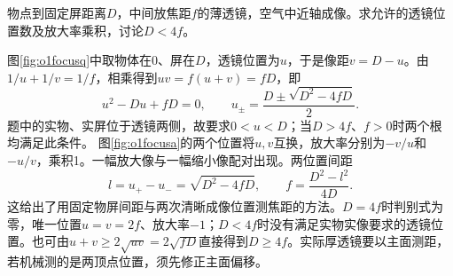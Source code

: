 \begin{exercise}\label{ex:o1focusplate}
物点到固定屏距离$D$，中间放焦距$f$的薄透镜，空气中近轴成像。求允许的透镜位置数及放大率乘积，讨论$D<4f$。
\end{exercise}
\begin{solution}
图\ref{fig:o1focusq}中取物体在0、屏在$D$，透镜位置为$u$，于是像距$v=D-u$。由$1/u+1/v=1/f$，相乘得到$uv=f(u+v)=fD$，即
\[
 u^2-Du+fD=0,\qquad
 u_\pm=\frac{D\pm\sqrt{D^2-4fD}}2.
\]
题中的实物、实屏位于透镜两侧，故要求$0<u<D$；当$D>4f$、$f>0$时两个根均满足此条件。
图\ref{fig:o1focusa}的两个位置将$u,v$互换，放大率分别为$-v/u$和$-u/v$，乘积1。一幅放大像与一幅缩小像配对出现。两位置间距
\[
 l=u_+-u_- =\sqrt{D^2-4fD},\qquad
 f=\frac{D^2-l^2}{4D}.
\]
这给出了用固定物屏间距与两次清晰成像位置测焦距的方法。$D=4f$时判别式为零，唯一位置$u=v=2f$、放大率$-1$；$D<4f$时没有满足实物实像要求的透镜位置。也可由$u+v\geq2\sqrt{uv}=2\sqrt{fD}$直接得到$D\geq4f$。实际厚透镜要以主面测距，若机械测的是两顶点位置，须先修正主面偏移。
\end{solution}

